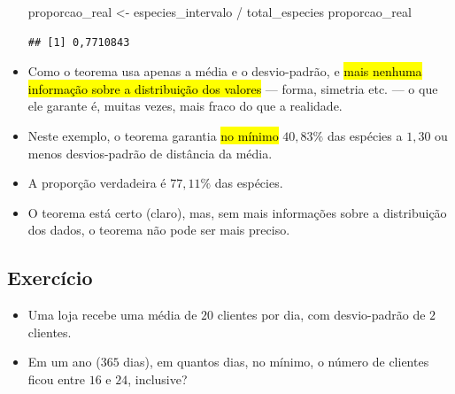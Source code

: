 \documentclass[
  11pt]{report}
\newenvironment{Shaded}{\begin{snugshade}}{\end{snugshade}}
\newcommand{\NormalTok}[1]{#1}
\newcommand{\OtherTok}[1]{\textcolor[rgb]{0.56,0.35,0.01}{#1}}
\newcommand{\SpecialCharTok}[1]{\textcolor[rgb]{0.00,0.00,0.00}{#1}}
\renewenvironment{Shaded}{
    \begin{mdframed}[%
      roundcorner=2pt,%
      innerleftmargin=5pt,%
      innerrightmargin=5pt,%
      topline=true,%
      leftline=true,%
      rightline=true,%
      bottomline=true,%
      linewidth=0.5pt,%
      linecolor=black!20,%
      backgroundcolor=black!2,%
      skipabove=2ex,%
      skipbelow=2.5ex%
    ]%
  }
  {
    \end{mdframed}
  }
\begin{document}
\begin{itemize}
\begin{Shaded}
\begin{Highlighting}[]
\NormalTok{proporcao\_real }\OtherTok{\textless{}{-}}\NormalTok{ especies\_intervalo }\SpecialCharTok{/}\NormalTok{ total\_especies}
\NormalTok{proporcao\_real}
\end{Highlighting}
\end{Shaded}

\begin{verbatim}
## [1] 0,7710843
\end{verbatim}
\item
  Como o teorema usa apenas a média e o desvio-padrão, e {\hl{mais nenhuma informação sobre a distribuição dos valores}} --- forma, simetria etc. --- o que ele garante é, muitas vezes, mais fraco do que a realidade.
\item
  Neste exemplo, o teorema garantia {\hl{no mínimo}} $40{,}83\%$ das espécies a $1{,}30$ ou menos desvios-padrão de distância da média.
\item
  A proporção verdadeira é $77{,}11\%$ das espécies.
\item
  O teorema está certo (claro), mas, sem mais informações sobre a distribuição dos dados, o teorema não pode ser mais preciso.
\end{itemize}

\hypertarget{exercuxedcio-2}{%
\subsection{Exercício}\label{exercuxedcio-2}}

\begin{itemize}
\item
  Uma loja recebe uma média de $20$ clientes por dia, com desvio-padrão de $2$ clientes.
\item
  Em um ano ($365$ dias), em quantos dias, no mínimo, o número de clientes ficou entre $16$ e $24$, inclusive?
\end{itemize}
\end{document}
